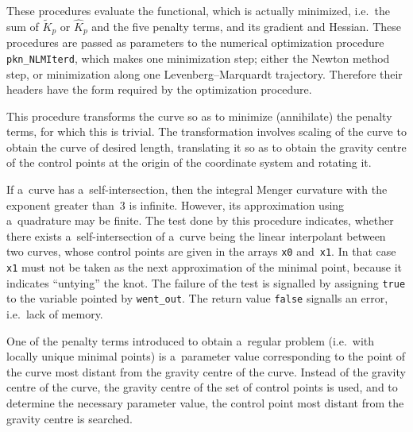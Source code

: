 These procedures evaluate the functional, which is actually minimized,
i.e.\ the sum of $\tilde{K}_p$ or $\hat{K}_p$ and the five penalty terms,
and its gradient and Hessian. These procedures are passed as parameters to
the numerical optimization procedure \texttt{pkn\_NLMIterd}, which makes one
minimization step; either the Newton method step, or minimization along one
Levenberg--Marquardt trajectory. Therefore their headers have the form
required by the optimization procedure.

\pagebreak

This procedure transforms the curve so as to minimize (annihilate) the
penalty terms, for which this is trivial. The transformation involves
scaling of the curve to obtain the curve of desired length, translating it
so as to obtain the gravity centre of the control points at the origin of
the coordinate system and rotating it.

\vspace{\medskipamount}

If a~curve has a~self-intersection, then the integral Menger curvature with
the exponent greater than~$3$ is infinite. However, its approximation using
a~quadrature may be finite. The test done by this procedure indicates,
whether there exists a~self-intersection of a~curve being the linear
interpolant between two curves, whose control points are given in the arrays
\texttt{x0} and~\texttt{x1}. In that case \texttt{x1} must not be taken as
the next approximation of the minimal point, because it indicates
``untying'' the knot. The failure of the test is signalled by assigning
\texttt{true} to the variable pointed by \texttt{went\_out}.
The return value \texttt{false} signalls an error, i.e.\ lack of memory.

\vspace{\medskipamount}
One of the penalty terms introduced to obtain a~regular
problem (i.e.\ with locally unique minimal points) is a~parameter value
corresponding to the point of the curve most distant from the gravity centre
of the curve. Instead of the gravity centre of the curve, the gravity centre
of the set of control points is used, and to determine the necessary parameter
value, the control point most distant from the gravity centre is searched.

